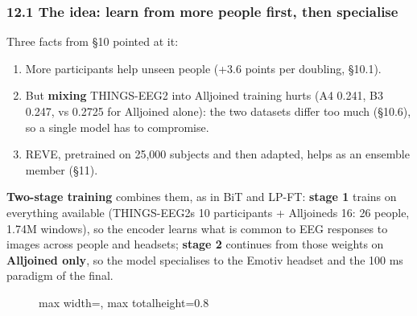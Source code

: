 \documentclass[
  11pt,
]{article}
\providecommand{\tightlist}{%
  \setlength{\itemsep}{0pt}\setlength{\parskip}{0pt}}
\renewcommand{\_}{\oldunderscore\allowbreak}
\begin{document}
\subsubsection{12.1 The idea: learn from
more people first, then
specialise}\label{the-idea-learn-from-more-people-first-then-specialise}

Three facts from §10 pointed at it:

\begin{enumerate}
\def\labelenumi{\arabic{enumi}.}
\tightlist
\item
  More participants help unseen people
  (+3.6 points per doubling, §10.1).
\item
  But \textbf{mixing} THINGS-EEG2 into
  Alljoined training hurts (A4 0.241, B3
  0.247, vs 0.2725 for Alljoined alone):
  the two datasets differ too much
  (§10.6), so a single model has to
  compromise.
\item
  REVE, pretrained on 25,000 subjects
  and then adapted, helps as an ensemble
  member (§11).
\end{enumerate}

\textbf{Two-stage training} combines
them, as in BiT and LP-FT: \textbf{stage
1} trains on everything available
(THINGS-EEG2\textquotesingle s 10
participants +
Alljoined\textquotesingle s 16: 26
people, 1.74M windows), so the encoder
learns what is common to EEG responses
to images across people and headsets;
\textbf{stage 2} continues from those
weights on \textbf{Alljoined only}, so
the model specialises to the Emotiv
headset and the 100 ms paradigm of the
final.

\begin{figure}[H]\centering
\begin{adjustbox}{max width=\linewidth, max totalheight=0.8\textheight}
\end{adjustbox}
\end{figure}
\end{document}
